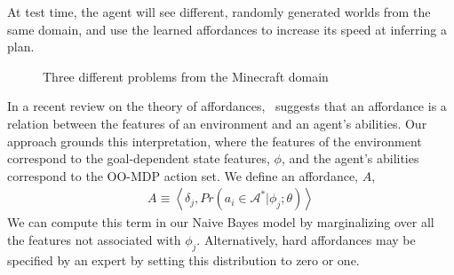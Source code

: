 \documentclass[letterpaper]{article}
\begin{document}
At test time, the agent will see different, randomly generated worlds
from the same domain, and use the learned affordances to increase its
speed at inferring a plan.


\begin{figure}
\centering
{}
  \caption{Three different problems from the Minecraft domain}
  \label{fig:minecraft}
\end{figure}

In a recent review on the theory of affordances,~\citet{chemero2003}
suggests that an affordance is a relation between the features of an
environment and an agent's abilities. Our approach grounds this
interpretation, where the features of the environment correspond to
the goal-dependent state features, $\phi$, and the agent's abilities
correspond to the OO-MDP action set.  We define an affordance, $A$, 
\begin{align}
A \equiv \left< \delta_j, Pr(a_i \in \mathcal{A}^* |
\phi_j; \theta) \right>
\end{align}
We can compute this term in our Naive Bayes model by marginalizing
over all the features not associated with $\phi_j$.  Alternatively,
hard affordances may be specified by an expert by setting this
distribution to zero or one. 
\end{document}
